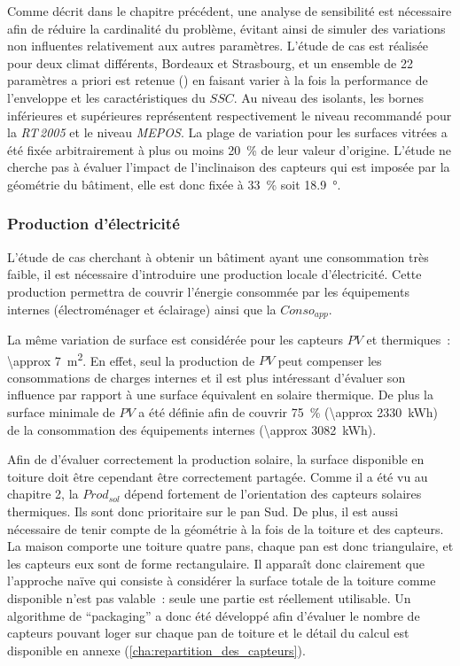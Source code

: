 Comme décrit dans le chapitre précédent, une analyse de sensibilité est nécessaire
afin de réduire la cardinalité du problème, évitant ainsi de simuler des variations
non influentes relativement aux autres paramètres.
L’étude de cas est réalisée pour deux climat différents, Bordeaux et Strasbourg,
et un ensemble de \num{22} paramètres a priori est retenue ()
en faisant varier à la fois la performance de l’enveloppe et les caractéristiques du $SSC$.
Au niveau des isolants, les bornes inférieures et supérieures représentent respectivement
le niveau recommandé pour la \textit{RT\,2005} et le niveau \textit{MEPOS}.
La plage de variation pour les surfaces vitrées a été fixée arbitrairement à plus ou moins \SI{20}{\percent}
de leur valeur d’origine. L’étude ne cherche pas à évaluer l’impact de l’inclinaison
des capteurs qui est imposée par la géométrie du bâtiment, elle est donc fixée à
\SI{33}{\percent} soit \SI{18.9}{\degree}.


\subsubsection{Production d’électricité} %
\label{ssub:production_d_électricite}
L’étude de cas cherchant à obtenir un bâtiment ayant une consommation très faible, il est
nécessaire d’introduire une production locale d’électricité. Cette production permettra de
couvrir l’énergie consommée par les équipements internes (électroménager et éclairage)
ainsi que la $Conso_{app}$.

La même variation de surface est considérée pour les capteurs $PV$ et thermiques~:
\SI{\approx 7}{\metre\squared}. En effet, seul la production de $PV$ peut
compenser les consommations de charges internes et il est plus intéressant d’évaluer son
influence par rapport à une surface équivalent en solaire thermique. De plus la surface
minimale de $PV$ a été définie afin de couvrir \SI{75}{\percent} (\SI{\approx 2330}{\kWh})
de la consommation des équipements internes (\SI{\approx 3082}{\kWh}).

Afin de d’évaluer correctement la production solaire, la surface disponible en toiture
doit être cependant être correctement partagée. Comme il a été vu au chapitre 2, la
$Prod_{sol}$ dépend fortement de l’orientation des capteurs solaires thermiques. Ils sont
donc prioritaire sur le pan Sud. De plus, il est aussi nécessaire de tenir compte de la
géométrie à la fois de la toiture et des capteurs. La maison comporte une toiture quatre
pans, chaque pan est donc triangulaire, et les capteurs eux sont de forme rectangulaire.
Il apparaît donc clairement que l’approche naïve qui consiste à considérer la surface
totale de la toiture comme disponible n’est pas valable~: seule une partie est réellement
utilisable. Un algorithme de \enquote{packaging} a donc été développé afin d’évaluer le
nombre de capteurs pouvant loger sur chaque pan de toiture et le détail du calcul est
disponible en annexe (\ref{cha:repartition_des_capteurs}).

